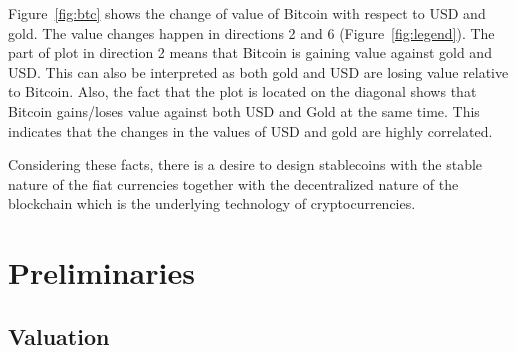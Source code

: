 Figure~\ref{fig:btc} shows the change of value of Bitcoin with respect to USD and gold. The value changes happen in directions 2 and 6 (Figure~\ref{fig:legend}). The part of plot in direction 2 means that Bitcoin is gaining value against gold and USD. This can also be interpreted as both gold and USD are losing value relative to Bitcoin. %
Also, the fact that the plot is located on the diagonal shows that Bitcoin gains/loses value against both USD and Gold at the same time. This indicates that the changes in the values of USD and gold are highly correlated.

Considering these facts, there is a desire to design stablecoins with the stable nature of the fiat currencies together with the decentralized nature of the blockchain which is the underlying technology of cryptocurrencies.


\section{Preliminaries}

\subsection{Valuation}

